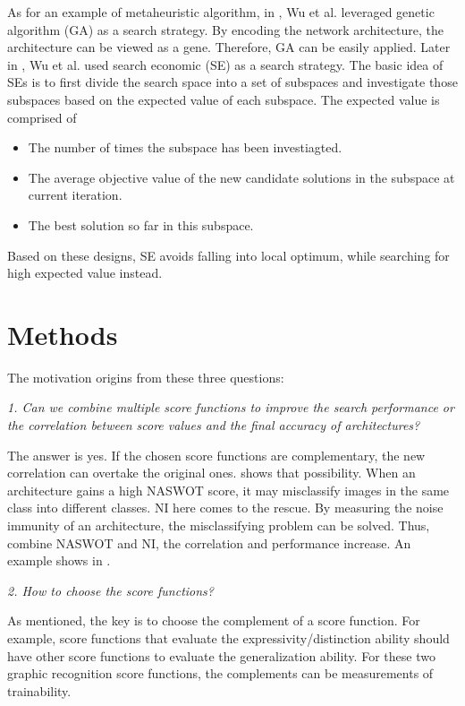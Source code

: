 \documentclass[sigconf]{acmart}
\begin{document}
    As for an example of metaheuristic algorithm, in \cite{10.1145/3491396.3506510}, Wu et al. leveraged 
    genetic algorithm (GA) as a search strategy. 
    By encoding the network architecture, the architecture can be viewed as a gene. Therefore, GA can be 
    easily applied. 
    Later in \cite{10092788}, Wu et al. used search economic (SE) \cite{7379579} as a search strategy. The 
    basic idea of SEs is to first divide the search space into a set of subspaces and investigate those 
    subspaces based on the expected value of each subspace. The expected value is comprised of 
    \begin{itemize}
        \item The number of times the subspace has been investiagted. 
        \item The average objective value of the new candidate solutions in the subspace at current iteration. 
        \item The best solution so far in this subspace. 
    \end{itemize}
    Based on these designs, SE avoids falling into local optimum, while searching for high expected value instead. 
    
    \section{Methods}
    \label{sec:proposed}
    
    The motivation origins from these three questions: 

    \textit{1. Can we combine multiple score functions to improve the search performance 
    or the correlation between score values and the final accuracy of architectures?}
    
    The answer is yes. If the chosen score functions are complementary, the new correlation 
    can overtake the original ones. \cite{10.1145/3491396.3506510} 
    shows that possibility. When an architecture gains a high NASWOT score, 
    it may misclassify images in the same class into different classes. NI here comes 
    to the rescue. By measuring the noise immunity of an architecture, the misclassifying problem 
    can be solved. Thus, combine NASWOT and NI, the correlation and performance increase. 
    An example shows in .

    \textit{2. How to choose the score functions?}

    As mentioned, the key is to choose the complement of a score function. For example, 
    score functions that evaluate the expressivity/distinction ability should have other 
    score functions to evaluate the generalization ability. For these two graphic recognition 
    score functions, the complements can be measurements of trainability. 
\end{document}

